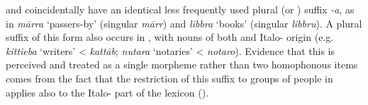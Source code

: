 \documentclass[output=paper]{langsci/langscibook}
\begin{document}
 and  coincidentally have an identical less frequently used plural (or ) suffix \textit{-a}, as in  \textit{m\={a}rra} `passers-by' (singular \textit{m\={a}rr}) and  \textit{libbra} `books' (singular \textit{libbru}). A plural suffix of this form also occurs in , with nouns of both  and Italo- origin (e.g. \textit{kittieba} `writers' <  \textit{katt\={a}b}; \textit{nutara} `notaries' <  \textit{notaro}). Evidence that this is perceived and treated as a single morpheme rather than two homophonous items comes from the fact that the restriction of this suffix to groups of people in  applies also to the Italo- part of the  lexicon (\citealt{mifsud2011}).
\end{document}
